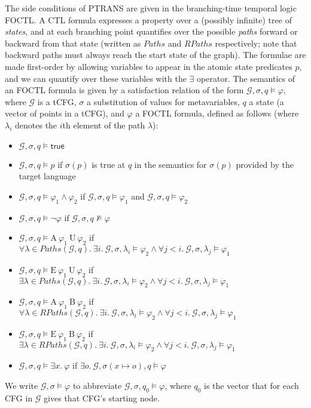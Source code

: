 \documentclass{eptcs}
\newcommand{\ptrans}[0]{PTRANS}
\newcommand{\AU}[2]{\textrm{A}\ #1\ \textrm{U}\ #2}
\newcommand{\EU}[2]{\textrm{E}\ #1\ \textrm{U}\ #2}
\newcommand{\EB}[2]{\textrm{E}\ #1\ \textrm{B}\ #2}
\newcommand{\AB}[2]{\textrm{A}\ #1\ \textrm{B}\ #2}
\begin{document}
\label{CTL}
The side conditions of {\ptrans} are given in the branching-time temporal logic \ac{FOCTL}. A \ac{CTL} formula expresses a property over a (possibly infinite) tree of \emph{states}, and at each branching point quantifies over the possible \emph{paths} forward or backward from that state (written as $\mathit{Paths}$ and $\mathit{RPaths}$ respectively; note that backward paths must always reach the start state of the graph). The formulae are made first-order by allowing variables to appear in the atomic state predicates $p$, and we can quantify over these variables with the $\exists$ operator. The semantics of an \ac{FOCTL} formula is given by a satisfaction relation of the form $\mathcal{G}, \sigma, q \models \varphi$, where $\mathcal{G}$ is a \ac{tCFG}, $\sigma$ a substitution of values for metavariables, $q$ a state (a vector of points in a \ac{tCFG}), and $\varphi$ a \ac{FOCTL} formula, defined as follows (where $\lambda_i$ denotes the $i$th element of the path $\lambda$):
\begin{itemize}
\item $\mathcal{G}, \sigma, q \models \mathsf{true}$
\item $\mathcal{G}, \sigma, q \models p$ if $\sigma(p)$ is true at $q$ in the semantics for $\sigma(p)$ provided by the target language
\item $\mathcal{G}, \sigma, q \models \varphi_1 \land \varphi_2$ if $\mathcal{G}, \sigma, q \models \varphi_1$ and $\mathcal{G}, \sigma, q \models \varphi_2$
\item $\mathcal{G}, \sigma, q \models \neg \varphi$ if $\mathcal{G}, \sigma, q \not\models \varphi$
\item $\mathcal{G}, \sigma, q \models \AU{\varphi_1}{\varphi_2}$ if $\forall \lambda\in \mathit{Paths}(\mathcal{G}, q).\ \exists i.\ \mathcal{G}, \sigma, \lambda_i \models \varphi_2 \land \forall j<i.\ \mathcal{G}, \sigma, \lambda_j \models \varphi_1$
\item $\mathcal{G}, \sigma, q \models \EU{\varphi_1}{\varphi_2}$ if $\exists \lambda\in \mathit{Paths}(\mathcal{G}, q).\ \exists i.\ \mathcal{G}, \sigma, \lambda_i \models \varphi_2 \land \forall j<i.\ \mathcal{G}, \sigma, \lambda_j \models \varphi_1$
\item $\mathcal{G}, \sigma, q \models \AB{\varphi_1}{\varphi_2}$ if $\forall \lambda\in \mathit{RPaths}(\mathcal{G}, q).\ \exists i.\ \mathcal{G}, \sigma, \lambda_i \models \varphi_2 \land \forall j<i.\ \mathcal{G}, \sigma, \lambda_j \models \varphi_1$
\item $\mathcal{G}, \sigma, q \models \EB{\varphi_1}{\varphi_2}$ if $\exists \lambda\in \mathit{RPaths}(\mathcal{G}, q).\ \exists i.\ \mathcal{G}, \sigma, \lambda_i \models \varphi_2 \land \forall j<i.\ \mathcal{G}, \sigma, \lambda_j \models \varphi_1$
\item $\mathcal{G}, \sigma, q \models \exists x.\ \varphi$ if $\exists o.\ \mathcal{G}, \sigma(x \mapsto o), q \models \varphi$
\end{itemize}
We write $\mathcal{G}, \sigma \models \varphi$ to abbreviate $\mathcal{G}, \sigma, q_0 \models \varphi$, where $q_0$ is the vector that for each \ac{CFG} in $\mathcal{G}$ gives that \ac{CFG}'s starting node.
\end{document}
